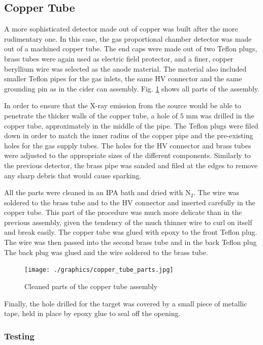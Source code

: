 \subsection{Copper Tube}

A more sophisticated detector made out of copper was built after the more rudimentary one. In this case, the gas proportional chamber detector was made out of a machined copper tube. The end caps were made out of two Teflon plugs, brass tubes were again used as electric field protector, and a finer, copper beryllium wire was selected as the anode material. The material also included smaller Teflon pipes for the gas inlets, the same HV connector and the same grounding pin as in the cider can assembly. Fig. \ref{fig:copper_parts} shows all parts of the assembly.

In order to ensure that the X-ray emission from the source would be able to penetrate the thicker walls of the copper tube, a hole of $5$ mm was drilled in the copper tube, approximately in the middle of the pipe. The Teflon plugs were filed down in order to match the inner radius of the copper pipe and the pre-existing holes for the gas supply tubes. The holes for the HV connector and brass tubes were adjusted to the appropriate sizes of the different components. Similarly to the previous detector, the brass pipe was sanded and filed at the edges to remove any sharp debris that would cause sparking.

All the parts were cleaned in an IPA bath and dried with N$_2$. The wire was soldered to the brass tube and to the HV connector and inserted carefully in the copper tube. This part of the procedure was much more delicate than in the previous assembly, given the tendency of the much thinner wire to curl on itself and break easily. The copper tube was glued with epoxy to the front Teflon plug. The wire was then passed into the second brass tube and in the back Teflon plug  The back plug was glued and the wire soldered to the brass tube.

\begin{figure}[htb]
  \centering
  \texttt{[image: ./graphics/copper\_tube\_parts.jpg]}
  \caption{Cleaned parts of the copper tube assembly}
  \label{fig:copper_parts}
\end{figure}

Finally, the hole drilled for the target was covered by a small piece of metallic tape, held in place by epoxy glue to seal off the opening.

\subsubsection{Testing}


